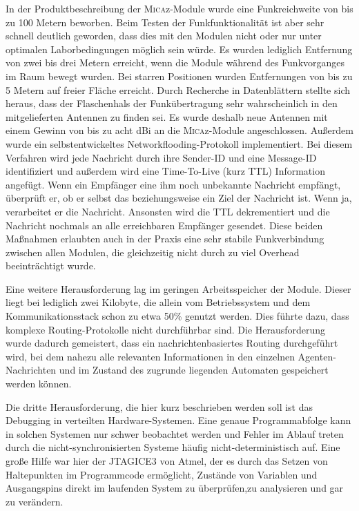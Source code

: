 In der Produktbeschreibung der \textsc{Mica}z-Module wurde eine Funkreichweite von bis zu 100 Metern beworben. Beim Testen der Funkfunktionalität ist aber sehr schnell deutlich geworden, dass dies mit den Modulen nicht oder nur unter optimalen Laborbedingungen möglich sein würde. Es wurden lediglich Entfernung von zwei bis drei Metern erreicht, wenn die Module während des Funkvorganges im Raum bewegt wurden. Bei starren Positionen wurden Entfernungen von bis zu 5 Metern auf freier Fläche erreicht. Durch Recherche in Datenblättern stellte sich heraus, dass der Flaschenhals der Funkübertragung sehr wahrscheinlich in den mitgelieferten Antennen zu finden sei. Es wurde deshalb neue Antennen mit einem Gewinn von bis zu acht dBi an die \textsc{Mica}z-Module angeschlossen. Außerdem wurde ein selbstentwickeltes Networkflooding-Protokoll implementiert. Bei diesem Verfahren wird jede Nachricht durch ihre Sender-ID und eine Message-ID identifiziert und außerdem wird eine Time-To-Live (kurz TTL) Information angefügt. Wenn ein Empfänger eine ihm noch unbekannte Nachricht empfängt, überprüft er, ob er selbst das beziehungsweise ein Ziel der Nachricht ist. Wenn ja, verarbeitet er die Nachricht. Ansonsten wird die TTL dekrementiert und die Nachricht nochmals an alle erreichbaren Empfänger gesendet.
Diese beiden Maßnahmen erlaubten auch in der Praxis eine sehr stabile Funkverbindung zwischen allen Modulen, die gleichzeitig nicht durch zu viel Overhead beeinträchtigt wurde.

Eine weitere Herausforderung lag im geringen Arbeitsspeicher der Module. Dieser liegt bei lediglich zwei Kilobyte, die allein vom Betriebssystem und dem Kommunikationsstack schon zu etwa 50\% genutzt werden. Dies führte dazu, dass komplexe Routing-Protokolle nicht durchführbar sind. Die Herausforderung wurde dadurch gemeistert, dass ein nachrichtenbasiertes Routing durchgeführt wird, bei dem nahezu alle relevanten Informationen in den einzelnen Agenten-Nachrichten und im Zustand des zugrunde liegenden Automaten gespeichert werden können. 

Die dritte Herausforderung, die hier kurz beschrieben werden soll ist das Debugging in verteilten Hardware-Systemen. Eine genaue Programmabfolge kann in solchen Systemen nur schwer beobachtet werden und Fehler im Ablauf treten durch die nicht-synchronisierten Systeme häufig nicht-deterministisch auf.
Eine große Hilfe war hier der JTAGICE3 von Atmel, der es durch das Setzen von Haltepunkten im Programmcode ermöglicht, Zustände von Variablen und Ausgangspins direkt im laufenden System zu überprüfen,zu analysieren und gar zu verändern.

